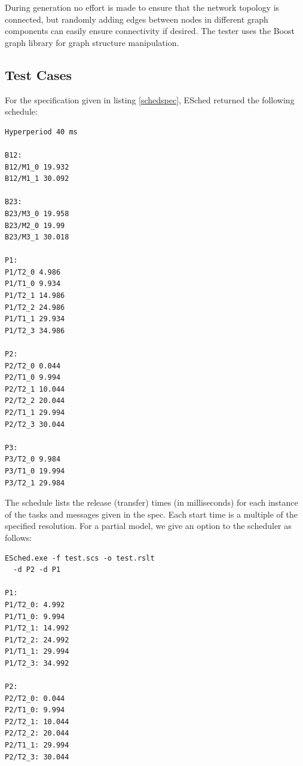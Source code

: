 During generation no effort is made to ensure that the network topology is connected, but randomly adding edges between nodes in different graph components can easily ensure connectivity if desired.  The tester uses the Boost graph library\cite{tools:bgl} for graph structure manipulation.

\subsection{Test Cases}

For the specification given in listing \ref{schedspec}, ESched returned the following schedule:

\begin{framed}
\lstset{basicstyle=\small,frame=none,label=schedrslt,caption=Sample schedule.}

\begin{lstlisting}
Hyperperiod 40 ms

B12:
B12/M1_0 19.932
B12/M1_1 30.092

B23:
B23/M3_0 19.958
B23/M2_0 19.99
B23/M3_1 30.018

P1:
P1/T2_0 4.986
P1/T1_0 9.934
P1/T2_1 14.986
P1/T2_2 24.986
P1/T1_1 29.934
P1/T2_3 34.986

P2:
P2/T2_0 0.044
P2/T1_0 9.994
P2/T2_1 10.044
P2/T2_2 20.044
P2/T1_1 29.994
P2/T2_3 30.044

P3:
P3/T2_0 9.984
P3/T1_0 19.994
P3/T2_1 29.984

\end{lstlisting}
\end{framed}

The schedule lists the release (transfer) times (in milliseconds) for each instance of the tasks and messages given in the spec.  Each start time is a multiple of the specified resolution.  For a partial model, we give an option to the scheduler as follows:

\begin{framed}
\lstset{basicstyle=\small,frame=none,label=schedrslt2,caption=Sample schedule.}

\begin{lstlisting}
ESched.exe -f test.scs -o test.rslt 
  -d P2 -d P1

P1:
P1/T2_0: 4.992
P1/T1_0: 9.994
P1/T2_1: 14.992
P1/T2_2: 24.992
P1/T1_1: 29.994
P1/T2_3: 34.992

P2:
P2/T2_0: 0.044
P2/T1_0: 9.994
P2/T2_1: 10.044
P2/T2_2: 20.044
P2/T1_1: 29.994
P2/T2_3: 30.044
\end{lstlisting}
\end{framed}

